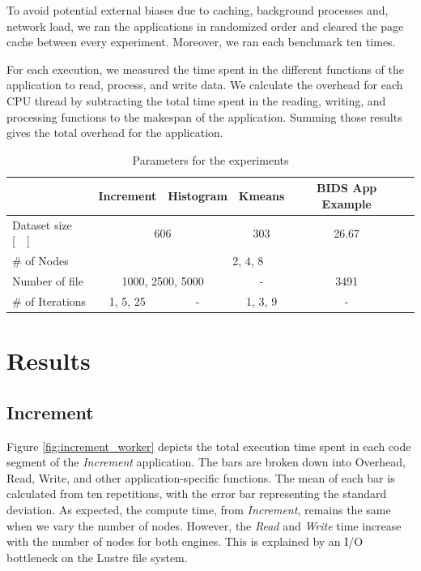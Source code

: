 \documentclass[conference]{IEEEtran}
\begin{document}
To avoid potential external biases due to caching, background processes and,
network load, we ran the applications in randomized order and cleared the
page cache between every experiment.
Moreover, we ran each benchmark ten times.
		
For each execution, we measured the time spent in the different functions of the
application to read, process, and write data.
We calculate the overhead for each CPU thread by subtracting the total time
spent in the reading, writing, and processing functions to the makespan of the application.
Summing those results gives the total overhead for the application.
		
\begin{table}[t]
	\renewcommand{\arraystretch}{1.5}
	\caption{Parameters for the experiments}\label{table:parameters}
	\centering
	\begin{tabular}{|l|c|c|c|c|c|}
		\hline           & Increment & Histogram & Kmeans  & BIDS App Example \\\hline
		Dataset size [\SI{}{\gibi\byte}] &\multicolumn{2}{c|}{606} & 303 & \multicolumn{1}{c|}{26.67} \\\hline
		\# of Nodes & \multicolumn{4}{c|}{2, 4, 8} \\\hline
		Number of file & \multicolumn{2}{c|}{1000, 2500, 5000} & - & \multicolumn{1}{c|}{3491} \\\hline
		\# of Iterations & 1, 5, 25  & -         & 1, 3, 9 & -                \\\hline
	\end{tabular}
\end{table}
		
\section{Results}
\subsection{Increment}
Figure \ref{fig:increment_worker} depicts the total execution time spent in each code segment of the \textit{Increment} application.
The bars are broken down into Overhead, Read, Write, and other application-specific functions.
The mean of each bar is calculated from ten repetitions, with the error bar representing the standard deviation.
As expected, the compute time, from \textit{Increment}, remains the same when we vary the number of nodes.
However, the \textit{Read} and \textit{Write} time increase with the number of nodes for both engines.
This is explained by an I/O bottleneck on the Lustre file system.
		
\end{document}

